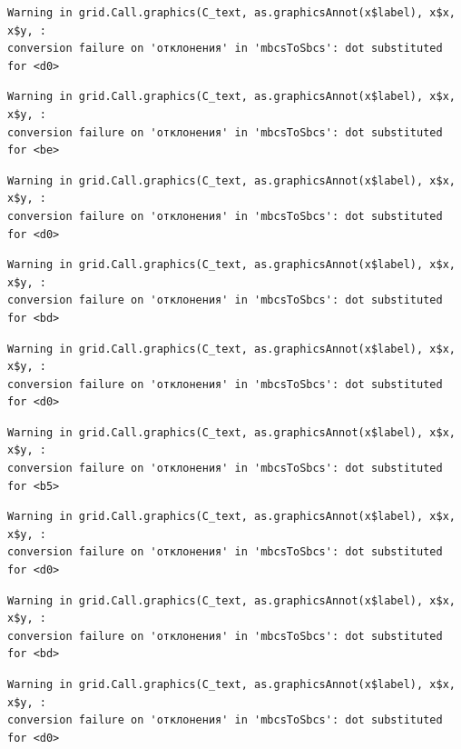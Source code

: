 \documentclass[
  letterpaper,
  DIV=11,
  numbers=noendperiod]{scrreprt}
\theoremstyle{definition}
\theoremstyle{remark}
\begin{document}
\begin{verbatim}
Warning in grid.Call.graphics(C_text, as.graphicsAnnot(x$label), x$x, x$y, :
conversion failure on 'отклонения' in 'mbcsToSbcs': dot substituted for <d0>
\end{verbatim}

\begin{verbatim}
Warning in grid.Call.graphics(C_text, as.graphicsAnnot(x$label), x$x, x$y, :
conversion failure on 'отклонения' in 'mbcsToSbcs': dot substituted for <be>
\end{verbatim}

\begin{verbatim}
Warning in grid.Call.graphics(C_text, as.graphicsAnnot(x$label), x$x, x$y, :
conversion failure on 'отклонения' in 'mbcsToSbcs': dot substituted for <d0>
\end{verbatim}

\begin{verbatim}
Warning in grid.Call.graphics(C_text, as.graphicsAnnot(x$label), x$x, x$y, :
conversion failure on 'отклонения' in 'mbcsToSbcs': dot substituted for <bd>
\end{verbatim}

\begin{verbatim}
Warning in grid.Call.graphics(C_text, as.graphicsAnnot(x$label), x$x, x$y, :
conversion failure on 'отклонения' in 'mbcsToSbcs': dot substituted for <d0>
\end{verbatim}

\begin{verbatim}
Warning in grid.Call.graphics(C_text, as.graphicsAnnot(x$label), x$x, x$y, :
conversion failure on 'отклонения' in 'mbcsToSbcs': dot substituted for <b5>
\end{verbatim}

\begin{verbatim}
Warning in grid.Call.graphics(C_text, as.graphicsAnnot(x$label), x$x, x$y, :
conversion failure on 'отклонения' in 'mbcsToSbcs': dot substituted for <d0>
\end{verbatim}

\begin{verbatim}
Warning in grid.Call.graphics(C_text, as.graphicsAnnot(x$label), x$x, x$y, :
conversion failure on 'отклонения' in 'mbcsToSbcs': dot substituted for <bd>
\end{verbatim}

\begin{verbatim}
Warning in grid.Call.graphics(C_text, as.graphicsAnnot(x$label), x$x, x$y, :
conversion failure on 'отклонения' in 'mbcsToSbcs': dot substituted for <d0>
\end{verbatim}
\end{document}
